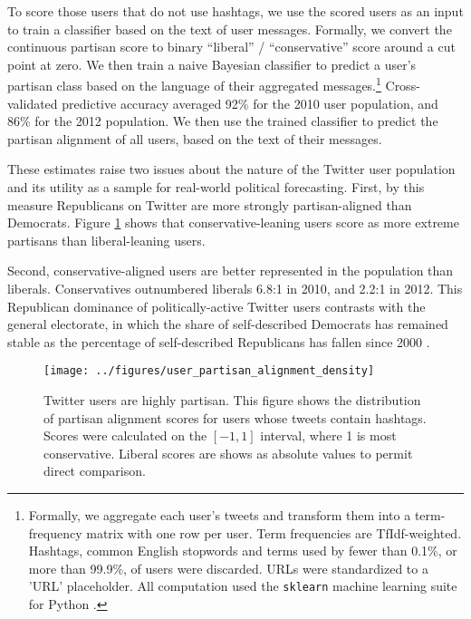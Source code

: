 \documentclass{acm_proc_article-sp}
\begin{document}
To score those users that do not use hashtags, we use the scored users
as an input to train a classifier based on the text of user
messages. Formally, we convert the continuous partisan score to binary
``liberal'' / ``conservative'' score around a cut point at zero. We
then train a naive Bayesian classifier to predict a user's
partisan class based on the language of their aggregated
messages.\footnote{Formally, we aggregate each user's tweets and
transform them into a term-frequency matrix with one row per
user. Term frequencies are TfIdf-weighted. Hashtags,
common English stopwords and terms used by fewer than 0.1\%, or more
than 99.9\%, of users were discarded. URLs were standardized to a
'URL' placeholder. All computation used the \texttt{sklearn} machine
learning suite for Python \cite{scikit-learn}.} Cross-validated
predictive accuracy averaged 92\% for the 2010 user population, and
86\% for the 2012 population. We then use the trained classifier to
predict the partisan alignment of all users, based on the text of
their messages.

These estimates raise two issues about the nature of the Twitter
user population and its utility as a sample for real-world political
forecasting. First, by this measure Republicans on Twitter are more
strongly partisan-aligned than Democrats. Figure
\ref{fig:user-pscore-distribution} shows that conservative-leaning
users score as more extreme partisans than liberal-leaning users.

Second, conservative-aligned users are better represented in the
population than liberals. Conservatives outnumbered liberals 6.8:1 in
2010, and 2.2:1 in 2012. This Republican dominance of
politically-active Twitter users contrasts with the general electorate,
in which the share of self-described Democrats has remained stable as
the percentage of self-described Republicans has fallen since 2000
\cite{pew2012}.



\begin{figure}[ht]
  \centering
  \texttt{[image: ../figures/user\_partisan\_alignment\_density]}
  \caption{Twitter users are highly partisan. This figure shows the distribution of partisan alignment
    scores for users whose tweets contain hashtags. Scores were
    calculated on the $[-1 , 1]$ interval, where 1 is most
    conservative. Liberal scores are shows as absolute values to permit direct comparison.}
  \label{fig:user-pscore-distribution}
\end{figure}
\end{document}
